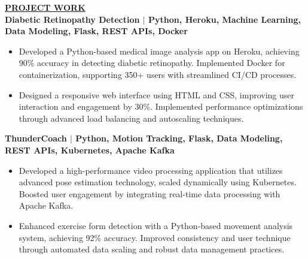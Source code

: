 \documentclass{article}
\begin{document}
\vspace{2mm} 
\noindent \textbf{\underline{PROJECT WORK}} \\
\noindent \textbf{Diabetic Retinopathy Detection $\mid$ {\small Python, Heroku, Machine Learning, Data Modeling, Flask, REST APIs, Docker}}
\begin{itemize}[noitemsep,nolistsep,leftmargin=*]
\item {\small Developed a Python-based medical image analysis app on Heroku, achieving 90\% accuracy in detecting diabetic retinopathy. Implemented Docker for containerization, supporting 350+ users with streamlined CI/CD processes.}
\item {\small Designed a responsive web interface using HTML and CSS, improving user interaction and engagement by 30\%. Implemented performance optimizations through advanced load balancing and autoscaling techniques.}
\end{itemize}

\vspace{2mm} 

\noindent \textbf{ThunderCoach $\mid$ {\small Python, Motion Tracking, Flask, Data Modeling, REST APIs, Kubernetes, Apache Kafka}}
\begin{itemize}[noitemsep,nolistsep,leftmargin=*]
\item {\small Developed a high-performance video processing application that utilizes advanced pose estimation technology, scaled dynamically using Kubernetes. Boosted user engagement by integrating real-time data processing with Apache Kafka.}
\item {\small Enhanced exercise form detection with a Python-based movement analysis system, achieving 92\% accuracy. Improved consistency and user technique through automated data scaling and robust data management practices.}
\end{itemize}





\end{document}

